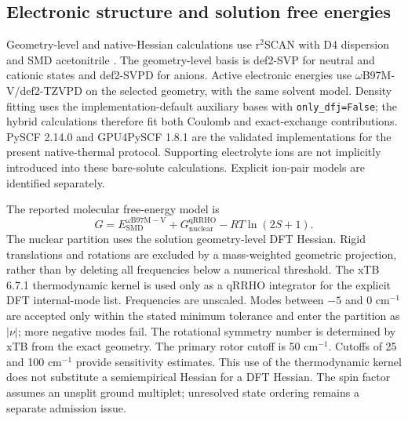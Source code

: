 \documentclass[11pt]{article}
\begin{document}
\subsection{Electronic structure and solution free energies}
Geometry-level and native-Hessian calculations use r$^2$SCAN with D4 dispersion and SMD acetonitrile \cite{r2scan2020,d42019,smd2009}. The geometry-level basis is def2-SVP for neutral and cationic states and def2-SVPD for anions. Active electronic energies use $\omega$B97M-V/def2-TZVPD on the selected geometry, with the same solvent model.\cite{wb97mv2016,def22005,diffuse2010} Density fitting uses the implementation-default auxiliary bases with \texttt{only\_dfj=False}; the hybrid calculations therefore fit both Coulomb and exact-exchange contributions. PySCF 2.14.0 and GPU4PySCF 1.8.1 are the validated implementations for the present native-thermal protocol.\cite{pyscf2020,gpu4pyscf2024} Supporting electrolyte ions are not implicitly introduced into these bare-solute calculations. Explicit ion-pair models are identified separately.

The reported molecular free-energy model is
\begin{equation}
G = E_{\mathrm{SMD}}^{\omega\mathrm{B97M-V}} + G_{\mathrm{nuclear}}^{\mathrm{qRRHO}} - RT\ln(2S+1).
\end{equation}
The nuclear partition uses the solution geometry-level DFT Hessian. Rigid translations and rotations are excluded by a mass-weighted geometric projection, rather than by deleting all frequencies below a numerical threshold. The xTB 6.7.1 thermodynamic kernel is used only as a qRRHO integrator for the explicit DFT internal-mode list.\cite{grimme2012,xtbprogram2021} Frequencies are unscaled. Modes between $-5$ and 0 cm$^{-1}$ are accepted only within the stated minimum tolerance and enter the partition as $|\nu|$; more negative modes fail. The rotational symmetry number is determined by xTB from the exact geometry. The primary rotor cutoff is 50 cm$^{-1}$. Cutoffs of 25 and 100 cm$^{-1}$ provide sensitivity estimates. This use of the thermodynamic kernel does not substitute a semiempirical Hessian for a DFT Hessian. The spin factor assumes an unsplit ground multiplet; unresolved state ordering remains a separate admission issue.
\end{document}
